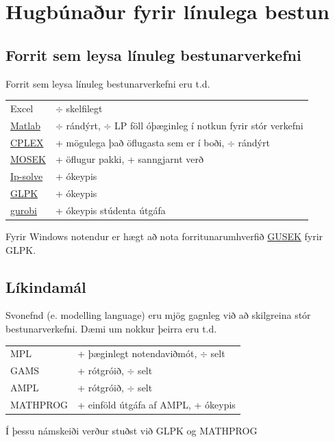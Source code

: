  

\section{Hugbúnaður fyrir línulega bestun}
\subsection{Forrit sem leysa línuleg bestunarverkefni}
Forrit sem leysa línuleg bestunarverkefni eru t.d.

\begin{tabular}{ll}
 Excel &  $\div$ skelfilegt \\
 \href{http://www.mathworks.com/products/matlab/}{Matlab} & $\div$ rándýrt, $\div$ LP föll óþæginleg í notkun fyrir stór verkefni \\
 \href{http://www-01.ibm.com/software/integration/optimization/cplex-optimizer/}{CPLEX} & + mögulega það öflugasta sem er í boði, $\div$ rándýrt \\
 \href{http://www.mosek.com/}{MOSEK} & + öflugur pakki, + sanngjarnt verð \\
 \href{http://lpsolve.sourceforge.net/5.0/}{Ip-solve} & + ókeypis \\
 \href{http://www.gnu.org/software/glpk/}{GLPK} & + ókeypis \\
 \href{http://www.gurobi.com/}{gurobi} & + ókeypis stúdenta útgáfa \\
\end{tabular}

Fyrir Windows notendur er hægt að nota forritunarumhverfið \href{http://gusek.sourceforge.net/gusek.html}{GUSEK} fyrir GLPK.
 
\subsection{Líkindamál}
Svonefnd  (e. modelling language) eru mjög gagnleg við að skilgreina stór bestunarverkefni. Dæmi um nokkur þeirra eru t.d.

\begin{tabular}{ll}
 MPL & + þæginlegt notendaviðmót, $\div$ selt \\
 GAMS & + rótgróið, $\div$ selt \\
 AMPL & + rótgróið, $\div$ selt \\
 MATHPROG & + einföld útgáfa af AMPL, + ókeypis 
\end{tabular}

\begin{aths}Í þessu námskeiði verður stuðst við GLPK og MATHPROG\end{aths}